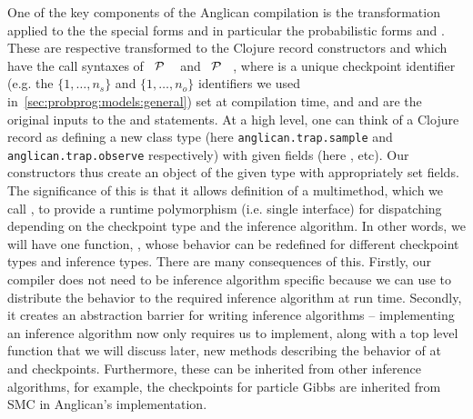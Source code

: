 One of the key components of the Anglican compilation is the transformation applied to the
the special forms and in particular the probabilistic forms \sample and \observe.  These
are respective transformed to the Clojure record constructors \samplecps and \observecps 
which have the call syntaxes of
 ~$\mathcal{P}$ ~\angstate\clj{)} and  ~$\mathcal{P}$ ~\angstate\clj{)},
where  is a unique checkpoint identifier (e.g. the $\{1,\dots,n_s\}$ and $\{1,\dots,n_o\}$ identifiers
we used in~\ref{sec:probprog:models:general}) set at compilation time, and   and 
are the original inputs to the \sample and \observe statements.  At a high level, one can
think of a Clojure record as defining a new class type (here {\small \texttt{anglican.trap.sample}} and {\small \texttt{anglican.trap.observe}}
respectively) with given fields (here ,  etc).  Our constructors thus create
an object of the given type with appropriately set fields.  The significance of this is that
it allows definition of a multimethod, which we call \checkpoint, to provide a runtime polymorphism
(i.e. single interface) for dispatching depending on the checkpoint
type and the inference algorithm.  In other words, we will have one function, \checkpoint, whose
behavior can be redefined for different checkpoint types and inference types.  There are many
consequences of this.  Firstly, our compiler does not need to be inference algorithm specific
because we can use \checkpoint to distribute the behavior to the required inference algorithm
at run time.  Secondly, it creates an abstraction barrier for writing inference algorithms -- implementing
an inference algorithm now only requires us to implement, along with a top level function \anginfer that
we will discuss later, new methods describing the behavior of \checkpoint at \sample and \observe
checkpoints.  Furthermore, these can be inherited from other inference algorithms, for example,
the \observe checkpoints for particle Gibbs are inherited from SMC in Anglican's implementation.

